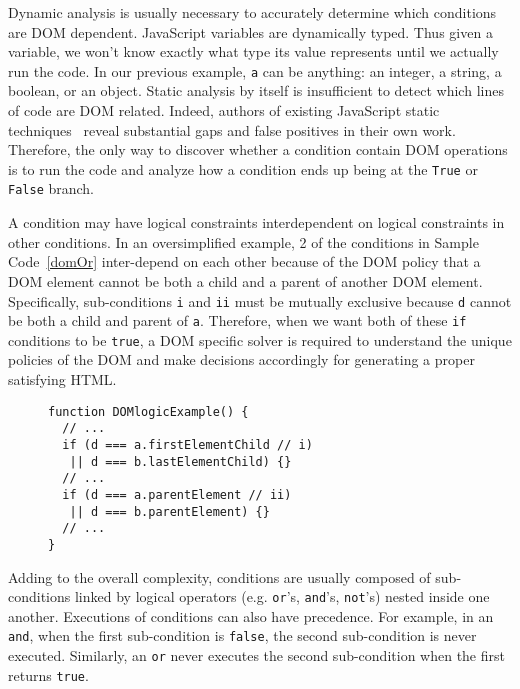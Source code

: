 Dynamic analysis is usually necessary to accurately determine which conditions are DOM dependent.  
JavaScript variables are dynamically typed.  Thus given a variable, we won't know exactly what type its value represents until we actually run the code.  
In our previous example, {\tt a} can be anything: an integer, a string, a boolean, or an object.  
Static analysis by itself is insufficient to detect which lines of code are DOM related.
Indeed, authors of existing JavaScript static techniques~\cite{staticJsWWW09, staticJsWWW11} reveal substantial gaps and false positives in their own work.  
Therefore, the only way to discover whether a condition contain DOM operations is to run the code and analyze how a condition ends up being at the {\tt True} or {\tt False} branch.

A condition may have logical constraints interdependent on logical constraints in other conditions.  
In an oversimplified example, 2 of the conditions in Sample Code~\ref{domOr} inter-depend on each other because of the DOM policy that a DOM element cannot be both a child and a parent of another DOM element.  
Specifically, sub-conditions {\tt i} and {\tt ii} must be mutually exclusive because {\tt d} cannot be both a child and parent of {\tt a}.
Therefore, when we want both of these {\tt if} conditions to be {\tt true}, a DOM specific solver is required to understand the unique policies of the DOM and make decisions accordingly for generating a proper satisfying HTML.
\begin{figure}
\begin{lstlisting}[caption=Example code showing conditions that have logical constraints interdepenent with each other.,label=domOr]  
function DOMlogicExample() {
  // ...
  if (d === a.firstElementChild // i)
   || d === b.lastElementChild) {}
  // ... 
  if (d === a.parentElement // ii)
   || d === b.parentElement) {}
  // ...
}
\end{lstlisting}
\end{figure}

Adding to the overall complexity, conditions are usually composed of sub-conditions linked by logical operators (e.g. {\tt or}'s, {\tt and}'s, {\tt not}'s) nested inside one another.
Executions of conditions can also have precedence.  For example, in an {\tt and}, when the first sub-condition is {\tt false}, the second sub-condition is never executed.  Similarly, an {\tt or} never executes the second sub-condition when the first returns {\tt true}.

